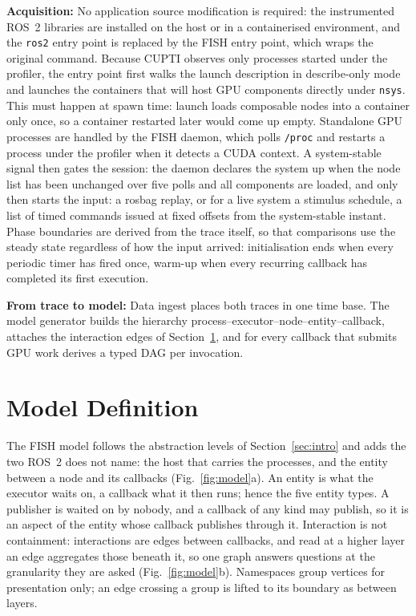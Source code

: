 \noindent
\textbf{Acquisition:}
No application source modification is required: the instrumented ROS~2 libraries
are installed on the host or in a containerised environment, and the
\texttt{ros2} entry point is replaced by the FISH entry point, which wraps the
original command. Because CUPTI observes only processes started under the
profiler, the entry point first walks the launch description in describe-only
mode and launches the containers that will host GPU components directly under
\texttt{nsys}. This must happen at spawn time: launch loads composable nodes into
a container only once, so a container restarted later would come up empty.
Standalone GPU processes are handled by the FISH daemon, which polls
\texttt{/proc} and restarts a process under the profiler when it detects a CUDA
context. A system-stable signal then gates the session: the daemon declares the
system up when the node list has been unchanged over five polls and all
components are loaded, and only then starts the input: a rosbag replay, or for a
live system a stimulus schedule, a list of timed commands issued at fixed
offsets from the system-stable instant. Phase boundaries are derived from the
trace itself, so that comparisons use the steady state regardless of how the
input arrived: initialisation ends when every periodic timer has fired once,
warm-up when every recurring callback has completed its first execution.

\noindent
\textbf{From trace to model:}
Data ingest places both traces in one time base. The model generator builds the
hierarchy process--executor--node--entity--callback, attaches the interaction
edges of Section~\ref{sec:model}, and for every callback that submits GPU work
derives a typed DAG per invocation.

\section{Model Definition}
\label{sec:model}

The FISH model follows the abstraction levels of Section~\ref{sec:intro} and
adds the two ROS~2 does not name: the host that carries the processes, and the
entity between a node and its callbacks (Fig.~\ref{fig:model}a). An entity is
what the executor waits on, a callback what it then runs; hence the five entity
types. A publisher is waited on by nobody, and a callback of any kind may
publish, so it is an aspect of the entity whose callback publishes through it.
Interaction is not containment: interactions are edges between callbacks, and
read at a higher layer an edge aggregates those beneath it, so one graph answers
questions at the granularity they are asked (Fig.~\ref{fig:model}b). Namespaces
group vertices for presentation only; an edge crossing a group is lifted to its
boundary as between layers.

